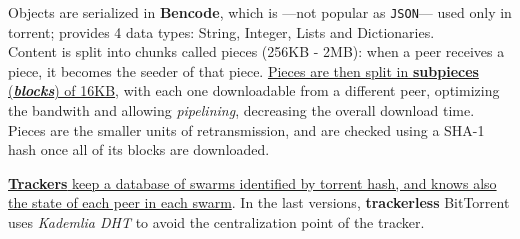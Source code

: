 Objects are serialized in \textbf{Bencode}, which is ---not popular as \texttt{JSON}--- used only in torrent; provides 4 data types: String, Integer, Lists and Dictionaries.\\
Content is split into chunks called pieces (256KB - 2MB):
when a peer receives a piece, it becomes the seeder of that piece.
\ul{Pieces are then split in \textbf{subpieces} (\textit{\textbf{blocks}}) of 16KB}, with each one downloadable from a different peer, optimizing the bandwith and allowing \textit{pipelining}, decreasing the overall download time.
Pieces are the smaller units of retransmission, and are checked using a SHA-1 hash once all of its blocks are downloaded.

\ul{\textbf{Trackers} keep a database of swarms identified by torrent hash, and knows also the state of each peer in each swarm}.
In the last versions, \textbf{trackerless} BitTorrent uses \textit{Kademlia DHT} to avoid the centralization point of the tracker.
\newpage
